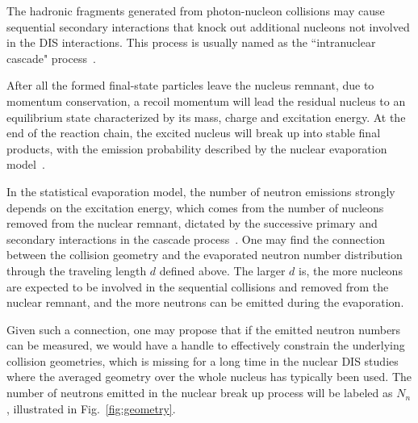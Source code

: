 The hadronic fragments generated from photon-nucleon collisions may cause
sequential secondary interactions that knock out additional nucleons
not involved in the DIS interactions. This process is usually named as the
``intranuclear cascade" process~\cite{Bertini:1963zzc}.

After all the formed final-state particles leave the nucleus remnant, due to
momentum conservation, a recoil momentum will lead the residual nucleus to an
equilibrium state characterized by its mass, charge and excitation energy. At
the end of the reaction chain, the excited nucleus will break up into stable
final products, with the emission probability described by the nuclear
evaporation model~\cite{Weisskopf:1937zz}.

In the statistical evaporation model, the number of neutron emissions strongly
depends on the excitation energy, which comes from the number of nucleons removed from
the nuclear remnant, dictated by the successive primary and secondary
interactions in the cascade process~\cite{Ferrari:1995cq}. One may find the
connection between the collision geometry and the evaporated neutron number
distribution through the traveling length $d$ defined above. The larger $d$
is, the more nucleons are expected to be involved in the sequential collisions
and removed from the nuclear remnant, and the more neutrons can be emitted during
the evaporation.


Given such a connection, one may propose that if the emitted
neutron numbers can be measured, we would have a handle to effectively
constrain the underlying collision geometries, which is missing for a long time
in the nuclear DIS studies where the averaged geometry over the whole nucleus
has typically been used. The number of neutrons emitted in the nuclear
break up process will be labeled as $N_{n}$, illustrated in
Fig.~\ref{fig:geometry}.

